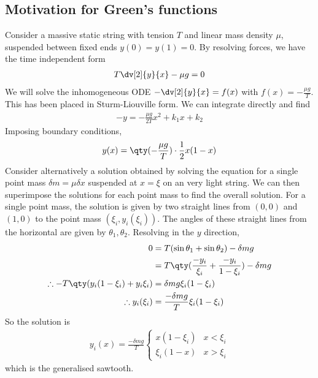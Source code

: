 \subsection{Motivation for Green's functions}
Consider a massive static string with tension $T$ and linear mass density $\mu$, suspended between fixed ends $y(0) = y(1) = 0$.
By resolving forces, we have the time independent form
\begin{align*}
	T \dv[2]{y}{x} - \mu g = 0
\end{align*}
We will solve the inhomogeneous ODE $- \dv[2]{y}{x} = f(x)$ with $f(x) = -\frac{\mu g}{T}$.
This has been placed in Sturm-Liouville form.
We can integrate directly and find
\begin{align*}
	-y = -\frac{\mu g}{2T} x^2 + k_1 x + k_2
\end{align*}
Imposing boundary conditions,
\begin{align*}
	y(x) = \qty(-\frac{\mu g}{T}) \cdot \frac{1}{2}x(1-x)
\end{align*}
Consider alternatively a solution obtained by solving the equation for a single point mass $\delta m = \mu \delta x$ suspended at $x = \xi$ on an very light string.
We can then superimpose the solutions for each point mass to find the overall solution.
For a single point mass, the solution is given by two straight lines from $(0,0)$ and $(1,0)$ to the point mass $(\xi_i, y_i(\xi_i))$.
The angles of these straight lines from the horizontal are given by $\theta_1, \theta_2$.
Resolving in the $y$ direction,
\begin{align*}
	0                                           & = T (\sin \theta_1 + \sin \theta_2) - \delta m g                \\
	                                            & = T\qty(\frac{-y_i}{\xi_i} + \frac{-y_i}{1-\xi_i}) - \delta m g \\
	\therefore -T\qty(y_i(1-\xi_i) + y_i \xi_i) & = \delta m g \xi_i(1-\xi_i)                                     \\
	\therefore y_i(\xi_i)                       & = \frac{-\delta m g}{T} \xi_i (1-\xi_i)
\end{align*}
So the solution is
\begin{align*}
	y_i(x) = \frac{-\delta m g}{T} \begin{cases}
		x(1-\xi_i)    & x < \xi_i \\
		\xi_i (1 - x) & x > \xi_i
	\end{cases}
\end{align*}
which is the generalised sawtooth.
